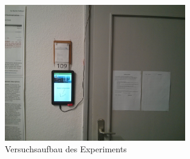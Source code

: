 \begin{figure}[h!]
  \centering
    \includegraphics[width=0.7\textwidth]{./img/experiment01.jpg}
  \caption{Versuchsaufbau des Experiments}
  \label{img:experiment01}
\end{figure}



